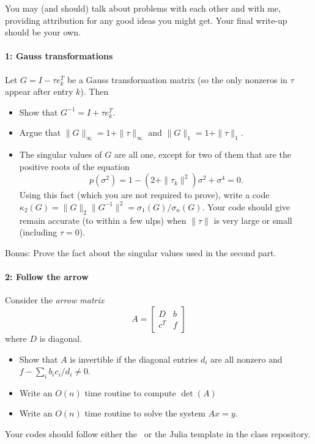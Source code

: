 \documentclass[12pt, leqno]{article} %
\begin{document}

You may (and should) talk about problems with each other and with me,
providing attribution for any good ideas you might get.  Your final
write-up should be your own.

\paragraph*{1: Gauss transformations}
Let $G = I-\tau e_k^T$ be a Gauss transformation matrix (so the only
nonzeros in $\tau$ appear after entry $k$).  Then
\begin{itemize}
\item Show that $G^{-1} = I+\tau e_k^T$.
\item Argue that $\|G\|_\infty = 1 + \|\tau\|_\infty$ and
  $\|G\|_1 = 1 + \|\tau\|_1$.
\item The singular values of $G$ are all one, except for two of them
  that are the positive roots of the equation
  \[
    p(\sigma^2) = 1 - (2+\|\tau_k\|^2) \sigma^2 + \sigma^4 = 0.
  \]
  Using this fact (which you are not required to prove), write a code
  $\kappa_2(G) = \|G\|_2 \|G^{-1}\|^2 = \sigma_1(G) / \sigma_n(G)$.
  Your code should give remain accurate (to within a few ulps) when
  $\|\tau\|$ is very large or small (including $\tau = 0$).
\end{itemize}
Bonus: Prove the fact about the singular values used in the second part.

\paragraph*{2: Follow the arrow}
Consider the {\em arrow matrix}
\[
  A = \begin{bmatrix} D & b \\ c^T & f \end{bmatrix}
\]
where $D$ is diagonal.
\begin{itemize}
\item Show that $A$ is invertible if the diagonal entries $d_i$ are
  all nonzero and $f-\sum_i b_i c_i / d_i \neq 0$.
\item Write an $O(n)$ time routine to compute $\det(A)$
\item Write an $O(n)$ time routine to solve the system $Ax = y$.
\end{itemize}
Your codes should follow either the \matlab\ or the Julia template in
the class repository.
\end{document}

